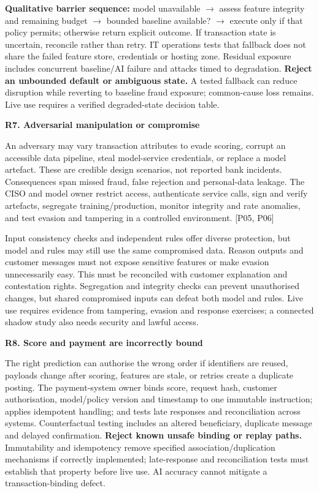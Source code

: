 \documentclass[11pt,a4paper]{article}
\newcommand{\sub}[1]{\par\vspace{2mm}\textbf{\color{ink}#1}\par}
\newcommand{\src}[1]{{\small[#1]}}
\newcommand{\risk}[2]{\sub{#1. #2}}
\begin{document}
\textbf{Qualitative barrier sequence:} model unavailable $\rightarrow$ assess feature integrity and remaining budget $\rightarrow$ bounded baseline available? $\rightarrow$ execute only if that policy permits; otherwise return explicit outcome. If transaction state is uncertain, reconcile rather than retry. IT operations tests that fallback does not share the failed feature store, credentials or hosting zone. Residual exposure includes concurrent baseline/AI failure and attacks timed to degradation. \textbf{Reject an unbounded default or ambiguous state.} A tested fallback can reduce disruption while reverting to baseline fraud exposure; common-cause loss remains. Live use requires a verified degraded-state decision table.
\risk{R7}{Adversarial manipulation or compromise}
An adversary may vary transaction attributes to evade scoring, corrupt an accessible data pipeline, steal model-service credentials, or replace a model artefact. These are credible design scenarios, not reported bank incidents. Consequences span missed fraud, false rejection and personal-data leakage. The CISO and model owner restrict access, authenticate service calls, sign and verify artefacts, segregate training/production, monitor integrity and rate anomalies, and test evasion and tampering in a controlled environment. \src{P05, P06}

Input consistency checks and independent rules offer diverse protection, but model and rules may still use the same compromised data. Reason outputs and customer messages must not expose sensitive features or make evasion unnecessarily easy. This must be reconciled with customer explanation and contestation rights. Segregation and integrity checks can prevent unauthorised changes, but shared compromised inputs can defeat both model and rules. Live use requires evidence from tampering, evasion and response exercises; a connected shadow study also needs security and lawful access.
\risk{R8}{Score and payment are incorrectly bound}
The right prediction can authorise the wrong order if identifiers are reused, payloads change after scoring, features are stale, or retries create a duplicate posting. The payment-system owner binds score, request hash, customer authorisation, model/policy version and timestamp to one immutable instruction; applies idempotent handling; and tests late responses and reconciliation across systems. Counterfactual testing includes an altered beneficiary, duplicate message and delayed confirmation. \textbf{Reject known unsafe binding or replay paths.} Immutability and idempotency remove specified association/duplication mechanisms if correctly implemented; late-response and reconciliation tests must establish that property before live use. AI accuracy cannot mitigate a transaction-binding defect.
\end{document}
